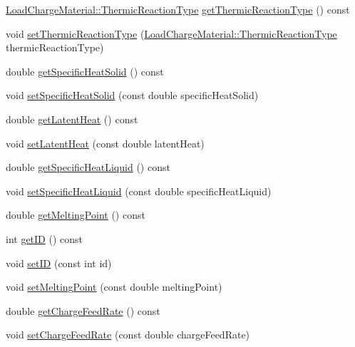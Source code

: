 \begin{DoxyCompactItemize}
\item 
\hyperlink{namespace_load_charge_material_a51d4263e865a5d86236622dd3fe23fd1}{Load\+Charge\+Material\+::\+Thermic\+Reaction\+Type} \hyperlink{class_solid_load_charge_material_a11708312a99ab985d980e1e521e0864c}{get\+Thermic\+Reaction\+Type} () const
\item 
void \hyperlink{class_solid_load_charge_material_ae2f85e0fbeff9f72b808bf86e645797f}{set\+Thermic\+Reaction\+Type} (\hyperlink{namespace_load_charge_material_a51d4263e865a5d86236622dd3fe23fd1}{Load\+Charge\+Material\+::\+Thermic\+Reaction\+Type} thermic\+Reaction\+Type)
\item 
double \hyperlink{class_solid_load_charge_material_af84f1f7dd167f67c0c02206339bbfe27}{get\+Specific\+Heat\+Solid} () const
\item 
void \hyperlink{class_solid_load_charge_material_ad9d2e3668a6a14700f4dced4882f98c0}{set\+Specific\+Heat\+Solid} (const double specific\+Heat\+Solid)
\item 
double \hyperlink{class_solid_load_charge_material_add60191bd282a9cefa4bf7a60301711b}{get\+Latent\+Heat} () const
\item 
void \hyperlink{class_solid_load_charge_material_ac7361119ab7cc352dfbdc6fcb9175981}{set\+Latent\+Heat} (const double latent\+Heat)
\item 
double \hyperlink{class_solid_load_charge_material_a8b02308194b603276df3a894c401e923}{get\+Specific\+Heat\+Liquid} () const
\item 
void \hyperlink{class_solid_load_charge_material_a91fad347bf52a4f6695c304904091797}{set\+Specific\+Heat\+Liquid} (const double specific\+Heat\+Liquid)
\item 
double \hyperlink{class_solid_load_charge_material_a4be001f6e6ecbd2ad0ae1d154559cdb0}{get\+Melting\+Point} () const
\item 
int \hyperlink{class_solid_load_charge_material_a99a4a5d50309c37bf95cb2b446bcba04}{get\+ID} () const
\item 
void \hyperlink{class_solid_load_charge_material_a4cc8e12ffb340c94106cecf576a85ae5}{set\+ID} (const int id)
\item 
void \hyperlink{class_solid_load_charge_material_a6c235b1c49be98b02829d37af9c38cb2}{set\+Melting\+Point} (const double melting\+Point)
\item 
double \hyperlink{class_solid_load_charge_material_af6f018c5d67e94d86f2f57fecaa32b5c}{get\+Charge\+Feed\+Rate} () const
\item 
void \hyperlink{class_solid_load_charge_material_adc50117256b714789f68097437ca658d}{set\+Charge\+Feed\+Rate} (const double charge\+Feed\+Rate)

\end{DoxyCompactItemize}
